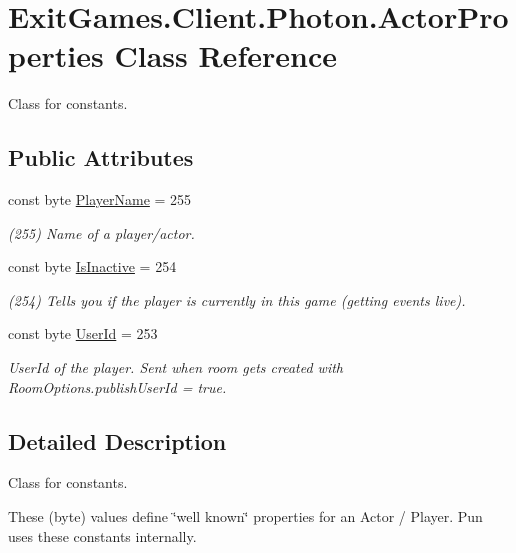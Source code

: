 \hypertarget{class_exit_games_1_1_client_1_1_photon_1_1_actor_properties}{}\section{Exit\+Games.\+Client.\+Photon.\+Actor\+Properties Class Reference}
\label{class_exit_games_1_1_client_1_1_photon_1_1_actor_properties}


Class for constants.  


\subsection*{Public Attributes}
\begin{DoxyCompactItemize}
\item 
const byte \hyperlink{class_exit_games_1_1_client_1_1_photon_1_1_actor_properties_afe2d90b754420c5a5bdea2895f645a46}{Player\+Name} = 255
\begin{DoxyCompactList}\small\item\em (255) Name of a player/actor.\end{DoxyCompactList}\item 
const byte \hyperlink{class_exit_games_1_1_client_1_1_photon_1_1_actor_properties_ab022ff7811e3b59b8de32931f0227087}{Is\+Inactive} = 254
\begin{DoxyCompactList}\small\item\em (254) Tells you if the player is currently in this game (getting events live). \end{DoxyCompactList}\item 
const byte \hyperlink{class_exit_games_1_1_client_1_1_photon_1_1_actor_properties_adfc9d5eec7a43fee4bbf227d6bb0451f}{User\+Id} = 253
\begin{DoxyCompactList}\small\item\em User\+Id of the player. Sent when room gets created with Room\+Options.\+publish\+User\+Id = true.\end{DoxyCompactList}\end{DoxyCompactItemize}


\subsection{Detailed Description}
Class for constants. 

These (byte) values define \char`\"{}well known\char`\"{} properties for an Actor / Player. Pun uses these constants internally. 

